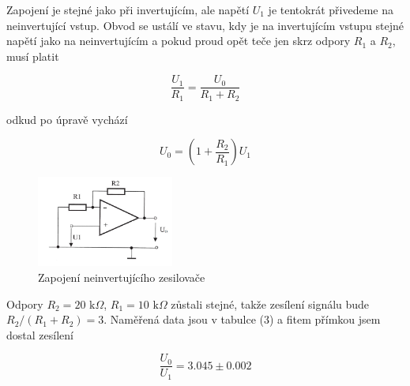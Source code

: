 \documentclass[a4paper,11pt]{article}
\begin{document}
Zapojení je stejné jako při invertujícím, ale napětí $ U_1 $ je tentokrát přivedeme na neinvertující vstup. Obvod se ustálí ve stavu, kdy je na invertujícím vstupu stejné napětí jako na neinvertujícím a pokud proud opět teče jen skrz odpory $ R_1 $ a $ R_2 $, musí platit

\begin{equation}
\frac{U_1}{R_1} = \frac{U_0}{R_1 + R_2}
\end{equation}

\noindent
odkud po úpravě vychází

\begin{equation}
U_0 = \left( 1 + \frac{R_2}{R_1} \right) U_1
\end{equation}


\begin{figure}[h]
    \centering
    \includegraphics[width=0.4\textwidth]{neinvertujici_sch.jpg}
    \caption{Zapojení neinvertujícího zesilovače}
\end{figure}

Odpory $ R_2 = 20 \text{ k} \Omega $, $ R_1 = 10 \text{ k} \Omega $ zůstali stejné, takže zesílení signálu bude $ R_2 / (R_1 + R_2) = 3 $. Naměřená data jsou v tabulce (3) a fitem přímkou jsem dostal zesílení

\begin{equation}
\frac{U_0}{U_1} = 3.045 \pm 0.002
\end{equation}
\end{document}
